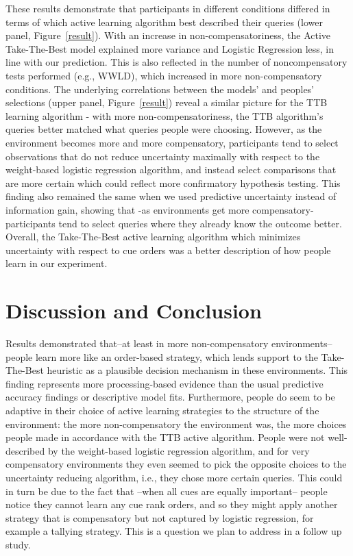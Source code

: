 \documentclass[10pt,letterpaper]{article}
\begin{document}
\newpage
 These results demonstrate that participants in different conditions differed in terms of which active learning algorithm best described their queries (lower panel, Figure~\ref{result}).  With an increase in non-compensatoriness, the Active Take-The-Best model explained more variance and Logistic Regression less, in line with our prediction. This is also reflected in the number of noncompensatory tests performed (e.g., WWLD), which increased in more non-compensatory conditions. The underlying correlations between the models' and peoples' selections (upper panel, Figure~\ref{result}) reveal a similar picture for the TTB learning algorithm - with more non-compensatoriness, the TTB algorithm's queries better matched what queries people were choosing. However, as the environment becomes more and more compensatory, participants tend to select observations that do not reduce uncertainty maximally with respect to the weight-based logistic regression algorithm, and instead select comparisons that are more certain which could reflect more confirmatory hypothesis testing. This finding also remained the same when we used predictive uncertainty instead of information gain, showing that -as environments get more compensatory- participants tend to select queries where they already know the outcome better. Overall, the Take-The-Best active learning algorithm which minimizes uncertainty with respect to cue orders was a better description of how people learn in our experiment.
\section{Discussion and Conclusion}
Results demonstrated that--at least in more non-compensatory environments-- people learn more like an order-based strategy, which lends support to the Take-The-Best heuristic as a plausible decision mechanism in these environments. This finding represents more processing-based evidence than the usual predictive accuracy findings or descriptive model fits.  Furthermore, people do seem to be adaptive in their choice of active learning strategies to the structure of the environment: the more non-compensatory the environment was, the more choices people made in accordance with the TTB active algorithm. People were not well-described by the weight-based logistic regression algorithm, and for very compensatory environments they even seemed to pick the opposite choices to the uncertainty reducing algorithm, i.e., they chose more certain queries. This could in turn be due to the fact that --when all cues are equally important-- people notice they cannot learn any cue rank orders, and so they might apply another strategy that is compensatory but not captured by logistic regression, for example a tallying strategy. This is a question we plan to address in a follow up study.\\
\end{document}

